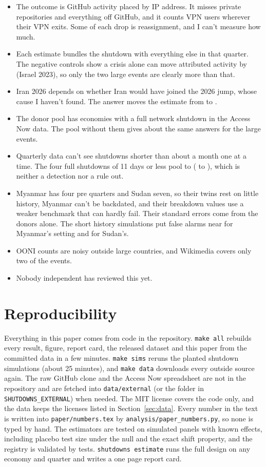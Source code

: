 \documentclass[11pt]{article}
\begin{document}
\begin{itemize}
\item The outcome is GitHub activity placed by IP address. It misses private repositories and everything off GitHub, and it counts VPN users wherever their VPN exits. Some of each drop is reassignment, and I can't measure how much.
\item Each estimate bundles the shutdown with everything else in that quarter. The negative controls show a crisis alone can move attributed activity by \ncIL{} (Israel 2023), so only the two large events are clearly more than that.
\item Iran 2026 depends on whether Iran would have joined the 2026 jump, whose cause I haven't found. The answer moves the estimate from \sdidIRc{} to \flatIR.
\item The donor pool has \nkioexcluded{} economies with a full network shutdown in the Access Now data. The pool without them gives about the same answers for the large events.
\item Quarterly data can't see shutdowns shorter than about a month one at a time. The four full shutdowns of 11 days or less pool to \shortpool{} (\shortpoollo{} to \shortpoolhi), which is neither a detection nor a rule out.
\item Myanmar has four pre quarters and Sudan seven, so their twins rest on little history, Myanmar can't be backdated, and their breakdown values use a weaker benchmark that can hardly fail. Their standard errors come from the donors alone. The short history simulations put false alarms near \shnormalMM{} for Myanmar's setting and \shnormalSD{} for Sudan's.
\item OONI counts are noisy outside large countries, and Wikimedia covers only two of the events.
\item Nobody independent has reviewed this yet.
\end{itemize}

\section{Reproducibility}

{\sloppy Everything in this paper comes from code in the repository. \texttt{make all} rebuilds every result, figure, report card, the released dataset and this paper from the committed data in a few minutes. \texttt{make sims} reruns the planted shutdown simulations (about 25 minutes), and \texttt{make data} downloads every outside source again. The raw GitHub clone and the Access Now spreadsheet are not in the repository and are fetched into \texttt{data/external} (or the folder in \texttt{SHUTDOWNS\_EXTERNAL}) when needed. The MIT license covers the code only, and the data keeps the licenses listed in Section~\ref{sec:data}. Every number in the text is written into \texttt{paper/numbers.tex} by \texttt{analysis/paper\_numbers.py}, so none is typed by hand. The estimators are tested on simulated panels with known effects, including placebo test size under the null and the exact shift property, and the registry is validated by tests. \texttt{shutdowns estimate} runs the full design on any economy and quarter and writes a one page report card.\par}
\end{document}
